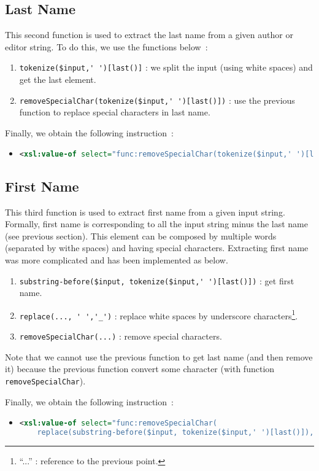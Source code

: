 \documentclass{article}
\begin{document}
  \subsection{Last Name} 
    This second function is used to extract the last name from a given author or editor string. To do this, we use the functions below~:
    \begin{enumerate}
      \item \verb|tokenize($input,' ')[last()]| : we split the input (using white spaces) and get the last element.
      \item \verb|removeSpecialChar(tokenize($input,' ')[last()])| : use the previous function to replace special characters in last name.
    \end{enumerate}
    Finally, we obtain the following instruction~:
    \begin{itemize}
      \item \begin{lstlisting}[language=XML]
<xsl:value-of select="func:removeSpecialChar(tokenize($input,' ')[last()])"/>\end{lstlisting}
    \end{itemize}

  \subsection{First Name} 
    This third function is used to extract first name from a given input string. Formally, first name is corresponding to all the input string minus the last name (see previous section). This element can be composed by multiple words (separated by withe spaces) and having special characters. Extracting first name was more complicated and has been implemented as below.
    \begin{enumerate}
      \item \verb|substring-before($input, tokenize($input,' ')[last()])| : get first name.
      \item \verb|replace(..., ' ','_')| : replace white spaces by underscore characters\footnote{ ``...'' : reference to the previous point.}.
      \item \verb|removeSpecialChar(...)| : remove special characters.
    \end{enumerate}
    Note that we cannot use the previous function to get last name (and then remove it) because the previous function convert some character (with function \verb|removeSpecialChar|).
    
    Finally, we obtain the following instruction~:
    \begin{itemize}
      \item \begin{lstlisting}[language=XML]
<xsl:value-of select="func:removeSpecialChar(
    replace(substring-before($input, tokenize($input,' ')[last()]), ' ' ,'_'))"/>\end{lstlisting}
    \end{itemize}
\end{document}
